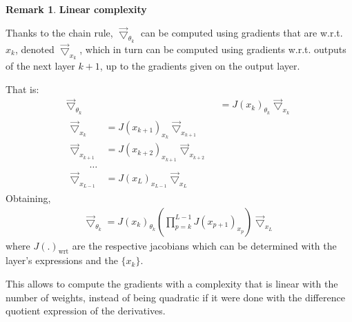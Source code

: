 \documentclass{article}
\theoremstyle{definition}
\newtheorem{remark}{Remark}
\newcommand{\ovec}{}
\begin{document}
\begin{remark}\textbf{Linear complexity}\\
{Thanks to the chain rule, $\vec{\bigtriangledown}_{\theta_k}$ can be computed using gradients that are w.r.t. $\ovec{x_k}$, denoted $\vec{\bigtriangledown}_{x_k}$, which in turn can be computed using gradients w.r.t. outputs of the next layer $k+1$, up to the gradients given on the output layer.

That is:
\begin{align}
  \vec{\bigtriangledown}_{\theta_k} & = J(\ovec{x_k})_{\theta_k} \vec{\bigtriangledown}_{x_k} \\
  \begin{split}
  \vec{\bigtriangledown}_{x_k} & = J(\ovec{x_{k+1}})_{x_k} \vec{\bigtriangledown}_{x_{k+1}} \\
  \vec{\bigtriangledown}_{x_{k+1}} & = J(\ovec{x_{k+2}})_{x_{k+1}} \vec{\bigtriangledown}_{x_{k+2}} \\
  \quad \quad \ldots\\
  \vec{\bigtriangledown}_{x_{L-1}} & = J(\ovec{x_{L}})_{x_{L-1}} \vec{\bigtriangledown}_{x_{L}}
  \label{eq:bp}
  \end{split}
\end{align}
Obtaining,
\begin{align}
  \vec{\bigtriangledown}_{\theta_k} = J(\ovec{x_k})_{\theta_k} (\prod_{p=k}^{L-1} J(\ovec{x_{p+1}})_{x_p}) \vec{\bigtriangledown}_{x_L}
\end{align}
where $J(.)_{\text{wrt}}$ are the respective jacobians which can be determined with the layer's expressions and the $\{x_k\}$.

This allows to compute the gradients with a complexity that is linear with the number of weights, instead of being quadratic if it were done with the difference quotient expression of the derivatives.}
\end{remark}
\end{document}
